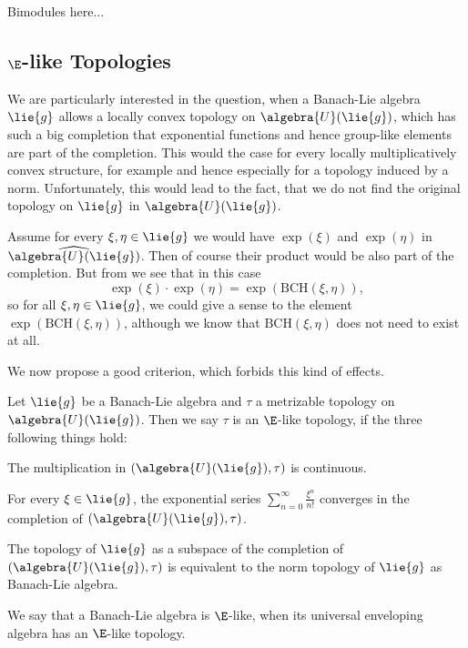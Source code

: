 \documentclass[
11pt,                          %
english                        %
]{article}
\newcommand{\bch}[2]{\mathrm{BCH}\left(#1, #2\right)}
\begin{document}
Bimodules here...



\subsection{$\E$-like Topologies}
We are particularly interested in the question, when a Banach-Lie algebra $\lie{g}$ allows a locally convex topology on $\algebra{U}(\lie{g})$, which has such a big completion that exponential functions and hence group-like elements are part of the completion. This would the case for every locally multiplicatively convex structure, for example and hence especially for a topology induced by a norm. Unfortunately, this would lead to the fact, that we do not find the original topology on $\lie{g}$ in $\algebra{U}(\lie{g})$.
\begin{remark}
	\label{Rem:BCHDesaster}
	Assume for every $\xi, \eta \in \lie{g}$ we would have $\exp(\xi)$ and 
	$\exp(\eta)$ in $\widehat{\algebra{U}(\lie{g})}$. Then of course their product 
	would be also part of the completion. But from 
	\cite{esposito.stapor.waldmann:2015a:pre} we see that in this case
	\begin{equation*}
		\exp(\xi) \cdot \exp(\eta)
		=
		\exp\left(
			\bch{\xi}{\eta}
		\right),
	\end{equation*}
	so for all $\xi, \eta \in \lie{g}$, we could give a sense to the element 
	$\exp\left( \bch{\xi}{\eta} \right)$, although we know that $\bch{\xi}{\eta}$ 
	does not need to exist at all. 
\end{remark}
We now propose a good criterion, which forbids this kind of effects.
\begin{definition}
	Let $\lie{g}$ be a Banach-Lie algebra and $\tau$ a metrizable topology on 
	$\algebra{U}(\lie{g})$. Then we say $\tau$ is an $\E$-like topology, if the 
	three following things hold:
	\begin{definitionlist}
		\item
		The multiplication in $(\algebra{U}(\lie{g}), \tau)$ is continuous.
		
		\item
		For every $\xi \in \lie{g}$, the exponential series $\sum_{n=0}^\infty 
		\frac{\xi^n}{n!}$ converges in the completion of $(\algebra{U}(\lie{g}), 
		\tau)$.
		
		\item
		The topology of $\lie{g}$ as a subspace of  the completion of $(\algebra{U}
		(\lie{g}), \tau)$ is equivalent to the norm topology of $\lie{g}$ as 
		Banach-Lie algebra.
	\end{definitionlist}
	We say that a Banach-Lie algebra is $\E$-like, when its universal enveloping 
	algebra has an $\E$-like topology.
\end{definition}
\end{document}
